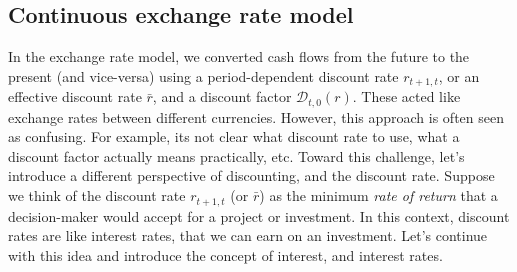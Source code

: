 \documentclass[11pt]{article}
\theoremstyle{definition}
\newcommand{\newterm}[1]{{\it #1}}
\begin{document}
\subsection{Continuous exchange rate model}
In the exchange rate model, we converted cash flows from the future to the present (and vice-versa) using a period-dependent discount rate $r_{t+1,t}$, 
or an effective discount rate $\bar{r}$, and a discount factor $\mathcal{D}_{t,0}(r)$. These acted like exchange rates between different currencies.
However, this approach is often seen as confusing. For example, its not clear what discount rate to use, what a discount factor actually means practically, etc.
Toward this challenge, let's introduce a different perspective of discounting, and the discount rate.
Suppose we think of the discount rate $r_{t+1,t}$  (or $\bar{r}$) as the minimum 
\newterm{rate of return} that a decision-maker 
would accept for a project or investment. In this context, discount rates are like interest rates, that we can earn on an investment.
Let's continue with this idea and introduce the concept of interest, and interest rates.
\end{document}
